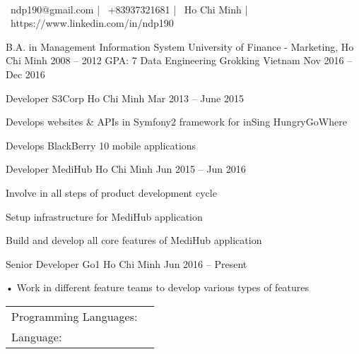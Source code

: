 \documentclass[]{awesome-cv}
\begin{document}
    
\begin{center}
	  \\
	\vspace{2mm}
	{\faEnvelope\ ndp190@gmail.com} | {\faMobile\ +83937321681} | {\faMapMarker\ Ho Chi Minh} | {\faLink\ https://www.linkedin.com/in/ndp190}
\end{center}
\begin{cventries}
	\cventry
	{B.A. in Management Information System}
	{University of Finance - Marketing, Ho Chi Minh}
	{}
	{2008 – 2012}
	{GPA: 7}
	\cventry
	{Data Engineering}
	{Grokking Vietnam}
	{}
	{Nov 2016 – Dec 2016}
	{}
\end{cventries}

\vspace{-2mm}
\begin{cventries}
	\cventry
	{Developer}
	{S3Corp}
	{Ho Chi Minh}
	{Mar 2013 – June 2015}
	{\begin{cvitems}
		\item {Develops websites \& APIs in Symfony2 framework for inSing HungryGoWhere}
		\item {Develops BlackBerry 10 mobile applications}
		\end{cvitems}}
	\cventry
	{Developer}
	{MediHub}
	{Ho Chi Minh}
	{Jun 2015 – Jun 2016}
	{\begin{cvitems}
		\item {Involve in all steps of product development cycle}
		\item {Setup infrastructure for MediHub application}
		\item {Build and develop all core features of MediHub application}
		\end{cvitems}}
	\cventry
	{Senior Developer}
	{Go1}
	{Ho Chi Minh}
	{Jun 2016 – Present}
	{\begin{cvitems}
		\item {•	Work in different feature teams to develop various types of features}
		\end{cvitems}}
\end{cventries}
\begin{cventries}
	\cventry
	{}
	{\def\arraystretch{1.15}{\begin{tabular}{ l l }
		Programming Languages:  & {\skill{ PHP, Javascript/Typescript/NodeJS, Python, Golang}} \\
		Language:  & {\skill{ English (Advance), Vietnamese (Native)}} \\
		\end{tabular}}}
	{}
	{}
	{}
\end{cventries}
\end{document}
